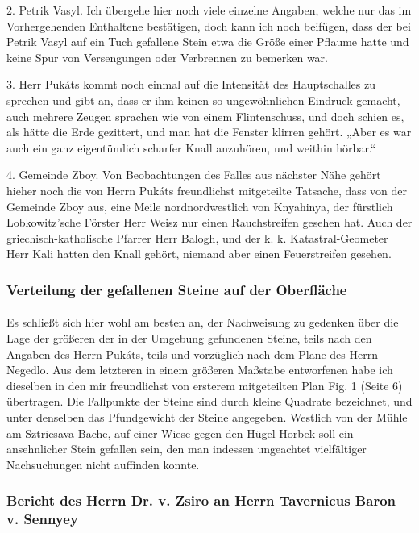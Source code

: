 \documentclass[a4paper, 11pt, oneside, german]{article}
\begin{document}
2. Petrik Vasyl. Ich übergehe hier noch viele einzelne Angaben, welche nur das im Vorhergehenden Enthaltene bestätigen, doch kann ich noch beifügen, dass der bei Petrik Vasyl auf ein Tuch gefallene Stein etwa die Größe einer Pflaume hatte und keine Spur von Versengungen oder Verbrennen zu bemerken war.

3. Herr Pukáts kommt noch einmal auf die Intensität des Hauptschalles zu sprechen und gibt an, dass er ihm keinen so ungewöhnlichen Eindruck gemacht, auch mehrere Zeugen sprachen wie von einem Flintenschuss, und doch schien es, als hätte die Erde gezittert, und man hat die Fenster klirren gehört. „Aber es war auch ein ganz eigentümlich scharfer Knall anzuhören, und weithin hörbar.“

4. Gemeinde Zboy. Von Beobachtungen des Falles aus nächster Nähe gehört hieher noch die von Herrn Pukáts freundlichst mitgeteilte Tatsache, dass von der Gemeinde Zboy aus, eine Meile nordnordwestlich von Knyahinya, der fürstlich Lobkowitz'sche Förster Herr Weisz nur einen Rauchstreifen gesehen hat. Auch der griechisch-katholische Pfarrer Herr Balogh, und der k. k. Katastral-Geometer Herr Kali hatten den Knall gehört, niemand aber einen Feuerstreifen gesehen.
\clearpage
\subsubsection{Verteilung der gefallenen Steine auf der Oberfläche}
\paragraph{}
Es schließt sich hier wohl am besten an, der Nachweisung zu gedenken über die Lage der größeren der in der Umgebung gefundenen Steine, teils nach den Angaben des Herrn Pukáts, teils und vorzüglich nach dem Plane des Herrn Negedlo. Aus dem letzteren in einem größeren Maßstabe entworfenen habe ich dieselben in den mir freundlichst von ersterem mitgeteilten Plan Fig. 1 (Seite 6) übertragen. Die Fallpunkte der Steine sind durch kleine Quadrate bezeichnet, und unter denselben das Pfundgewicht der Steine angegeben. Westlich von der Mühle am Sztricsava-Bache, auf einer Wiese gegen den Hügel Horbek soll ein ansehnlicher Stein gefallen sein, den man indessen ungeachtet vielfältiger Nachsuchungen nicht auffinden konnte.
\clearpage
\subsubsection{Bericht des Herrn Dr. v. Zsiro an Herrn Tavernicus Baron v. Sennyey}
\end{document}
